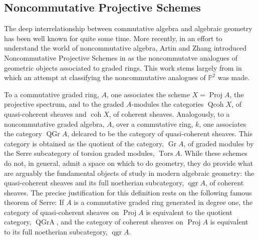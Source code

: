 \documentclass[11pt]{article}
\begin{document}
\subsection{Noncommutative Projective Schemes}
The deep interrelationship between commutative algebra and algebraic geometry has been well known for quite some time.
More recently, in an effort to understand the world of noncommutative algebra, Artin and Zhang introduced Noncommutative Projective Schemes in \cite{AZ94} as the noncommutatve analogues of geometric objects associated to graded rings.
This work stems largely from \cite{AS87} in which an attempt at classifying the noncommutative analogues of $\mathbb{P}^2$ was made.

To a commutative graded ring, $A$, one associates the scheme $X = \operatorname{Proj} A$, the projective spectrum, and to the graded $A$-modules the categories $\operatorname{Qcoh} X$, of quasi-coherent sheaves and $\operatorname{coh} X$, of coherent sheaves.  Analogously, to a noncommutative graded algebra, $A$, over a commutative ring, $k$, one associates the category $\operatorname{QGr} A$, delcared to be the category of quasi-coherent sheaves.
This category is obtained as the quotient of the category, $\operatorname{Gr} A$, of graded modules by the Serre subcategory of torsion graded modules, $\operatorname{Tors} A$.
While these schemes do not, in general, admit a space on which to do geometry, they do provide what are arguably the fundamental objects of study in modern algebraic geometry: the quasi-coherent sheaves and its full noetherian subcategory, $\operatorname{qgr} A$, of coherent sheaves.
The  precise justification for this definition rests on the following famous theorem of Serre: If $A$ is a commutative graded ring generated in degree one, the category of quasi-coherent sheaves on $\operatorname{Proj} A$ is equivalent to the quotient category, $\operatorname{QGr A}$, and the category of coherent sheaves on $\operatorname{Proj} A$ is equivalent to its full noetherian subcategory, $\operatorname{qgr} A$.
\end{document}
